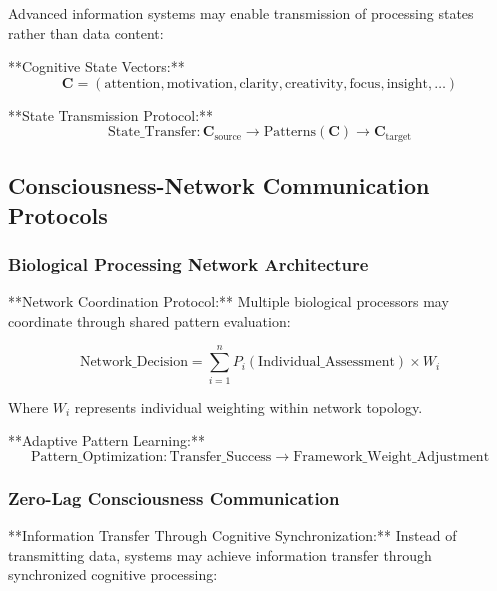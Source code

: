 \documentclass[12pt,a4paper]{article}
\begin{document}
Advanced information systems may enable transmission of processing states rather than data content:

**Cognitive State Vectors:**
\begin{equation}
\mathbf{C} = (\text{attention}, \text{motivation}, \text{clarity}, \text{creativity}, \text{focus}, \text{insight}, \ldots)
\label{eq:cognitive_state_vector}
\end{equation}

**State Transmission Protocol:**
\begin{equation}
\text{State\_Transfer}: \mathbf{C}_{\text{source}} \rightarrow \text{Patterns}(\mathbf{C}) \rightarrow \mathbf{C}_{\text{target}}
\label{eq:state_transmission}
\end{equation}

\subsection{Consciousness-Network Communication Protocols}

\subsubsection{Biological Processing Network Architecture}

**Network Coordination Protocol:** Multiple biological processors may coordinate through shared pattern evaluation:

\begin{equation}
\text{Network\_Decision} = \sum_{i=1}^{n} P_i(\text{Individual\_Assessment}) \times W_i
\label{eq:network_coordination}
\end{equation}

Where $W_i$ represents individual weighting within network topology.

**Adaptive Pattern Learning:**
\begin{equation}
\text{Pattern\_Optimization}: \text{Transfer\_Success} \rightarrow \text{Framework\_Weight\_Adjustment}
\label{eq:adaptive_learning}
\end{equation}

\subsubsection{Zero-Lag Consciousness Communication}

**Information Transfer Through Cognitive Synchronization:** Instead of transmitting data, systems may achieve information transfer through synchronized cognitive processing:
\end{document}
